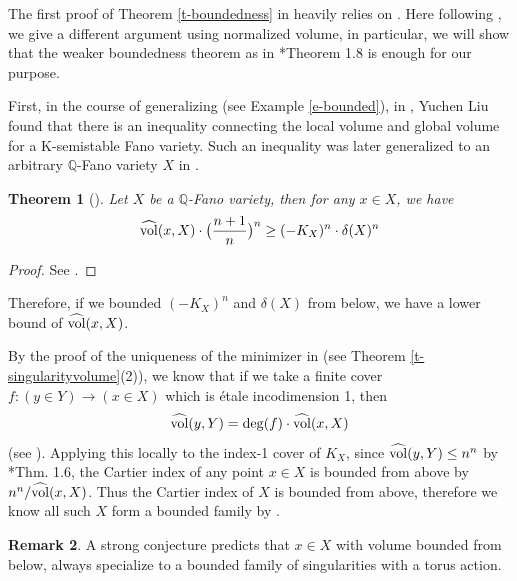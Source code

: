 \documentclass[12pt,reqno]{amsart}%
\newtheorem{thm}{Theorem}[section]
\theoremstyle{definition}
\newtheorem{rem}[thm]{Remark}
\theoremstyle{remark}
\newcommand{\hvol}{\widehat{\rm vol}}
\begin{document}
The first proof of Theorem \ref{t-boundedness} in  \cite{Jia17} heavily relies on \cite{Bir19}. Here following \cite{XZ20}, we give a different argument using normalized volume, in particular, we will show that the weaker boundedness theorem as in \cite{HMX14}*{Theorem 1.8} is enough for our purpose. 

First, in the course of generalizing \cite{Fuj18} (see Example \ref{e-bounded}), in \cite[Theorem 1]{Liu18}, Yuchen Liu found that there is an inequality connecting the local volume and global volume for a K-semistable Fano variety. Such an inequality was later generalized to an arbitrary $\mathbb{Q}$-Fano variety $X$ in \cite{BJ20}.
 \begin{thm}[{\cite{Fuj18,Liu18, BJ20}}]\label{t-localtoglobal}
 Let $X$ be a $\mathbb{Q}$-Fano variety, then for any $x\in X$, we have
 \[
 \hvol(x, X)\cdot \big(\frac{n+1}{n} \big)^n\ge (-K_X)^n\cdot\delta(X)^n
 \]
 \end{thm}
\begin{proof}See \cite[Theorem D]{BJ20}.
\end{proof}

Therefore, if we bounded $(-K_X)^n$ and $\delta(X)$ from below, we have a lower bound of  $\hvol(x, X)$.



By the proof of the uniqueness of the minimizer in \cite{XZ20} (see Theorem \ref{t-singularityvolume}(2)), we know that if we take a finite cover $f\colon(y\in Y)\to (x\in X)$ which is \'etale incodimension 1, then 
$$\hvol(y,Y)=\deg(f)\cdot \hvol(x,X)$$
(see \cite[Theorem 1.3]{XZ20}).
Applying this locally to the index-1 cover of $K_X$,  since $\hvol(y,Y)\le n^n$ by \cite{LX19}*{Thm. 1.6}, the Cartier index of any point $x\in X$ is bounded from above by ${n^n}/{\hvol(x,X)}$. Thus the Cartier index of $X$ is bounded from above, therefore we know all such $X$ form a bounded family by \cite[Theorem 1.8]{HMX14}. 

\begin{rem}
A  strong conjecture predicts that $x\in X$ with volume bounded from below, always specialize to a bounded family of singularities with a torus action. 
\end{rem}
\end{document}
